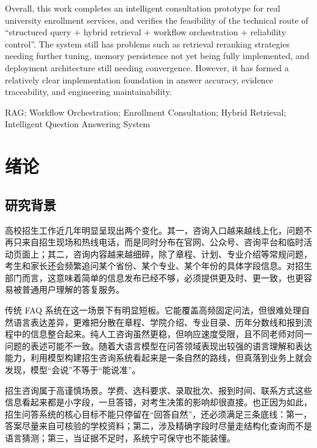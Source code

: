 \documentclass[UTF8,zihao=-4,oneside]{ctexbook}
\numberwithin{equation}{chapter}
\begin{document}
Overall, this work completes an intelligent consultation prototype for real university enrollment services, and verifies the feasibility of the technical route of ``structured query + hybrid retrieval + workflow orchestration + reliability control''. The system still has problems such as retrieval reranking strategies needing further tuning, memory persistence not yet being fully implemented, and deployment architecture still needing convergence. However, it has formed a relatively clear implementation foundation in answer accuracy, evidence traceability, and engineering maintainability.

\vspace{0.8em}
RAG; Workflow Orchestration; Enrollment Consultation; Hybrid Retrieval; Intelligent Question Answering System

\clearpage
\tableofcontents

\clearpage
{}
\setcounter{page}{1}
\pagestyle{thesismain}

\chapter{绪论}

\section{研究背景}
高校招生工作近几年明显呈现出两个变化。其一，咨询入口越来越线上化，问题不再只来自招生现场和热线电话，而是同时分布在官网、公众号、咨询平台和临时活动页面上；其二，咨询内容越来越细碎，除了章程、计划、专业介绍等常规问题，考生和家长还会频繁追问某个省份、某个专业、某个年份的具体字段信息。对招生部门而言，这意味着简单的信息发布已经不够，必须提供更及时、更一致，也更容易被普通用户理解的答复服务。

传统 FAQ 系统在这一场景下有明显短板。它能覆盖高频固定问法，但很难处理自然语言表达差异，更难把分散在章程、学院介绍、专业目录、历年分数线和报到流程中的信息整合起来。纯人工咨询虽然更稳，但响应速度受限，且不同老师对同一问题的表述可能不一致。随着大语言模型在问答领域表现出较强的语言理解和表达能力，利用模型构建招生咨询系统看起来是一条自然的路线，但真落到业务上就会发现，模型“会说”不等于“能说准”。

招生咨询属于高谨慎场景。学费、选科要求、录取批次、报到时间、联系方式这些信息看起来都是小字段，一旦答错，对考生决策的影响却很直接。也正因为如此，招生问答系统的核心目标不能只停留在“回答自然”，还必须满足三条底线：第一，答案尽量来自可核验的学校资料；第二，涉及精确字段时尽量走结构化查询而不是语言猜测；第三，当证据不足时，系统宁可保守也不能装懂。
\end{document}
